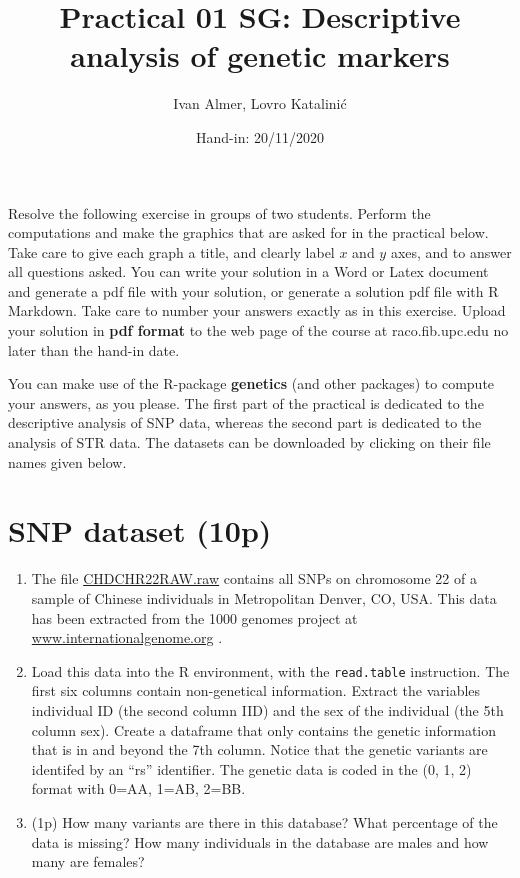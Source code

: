 \documentclass[
]{article}
\title{Practical 01 SG: Descriptive analysis of genetic markers}
\author{Ivan Almer, Lovro Katalinić}
\date{Hand-in: 20/11/2020}
\begin{document}
\maketitle

Resolve the following exercise in groups of two students. Perform the
computations and make the graphics that are asked for in the practical
below. Take care to give each graph a title, and clearly label \(x\) and
\(y\) axes, and to answer all questions asked. You can write your
solution in a Word or Latex document and generate a pdf file with your
solution, or generate a solution pdf file with R Markdown. Take care to
number your answers exactly as in this exercise. Upload your solution in
\textbf{pdf format} to the web page of the course at raco.fib.upc.edu no
later than the hand-in date.

You can make use of the R-package \textbf{genetics} (and other packages)
to compute your answers, as you please. The first part of the practical
is dedicated to the descriptive analysis of SNP data, whereas the second
part is dedicated to the analysis of STR data. The datasets can be
downloaded by clicking on their file names given below.

\hypertarget{snp-dataset-10p}{%
\section{SNP dataset (10p)}\label{snp-dataset-10p}}

\begin{enumerate}
\def\labelenumi{\arabic{enumi}.}
\item
  The file
  \href{http://www-eio.upc.es/~jan/data/bsg/CHDCHR22RAW.raw}{CHDCHR22RAW.raw}
  contains all SNPs on chromosome 22 of a sample of Chinese individuals
  in Metropolitan Denver, CO, USA. This data has been extracted from the
  1000 genomes project at
  \href{http://www.internationalgenome.org}{www.internationalgenome.org}
  .
\item
  Load this data into the R environment, with the \texttt{read.table}
  instruction. The first six columns contain non-genetical information.
  Extract the variables individual ID (the second column IID) and the
  sex of the individual (the 5th column sex). Create a dataframe that
  only contains the genetic information that is in and beyond the 7th
  column. Notice that the genetic variants are identifed by an ``rs''
  identifier. The genetic data is coded in the (0, 1, 2) format with
  0=AA, 1=AB, 2=BB.
\item
  (1p) How many variants are there in this database? What percentage of
  the data is missing? How many individuals in the database are males
  and how many are females?
\end{enumerate}
\end{document}
